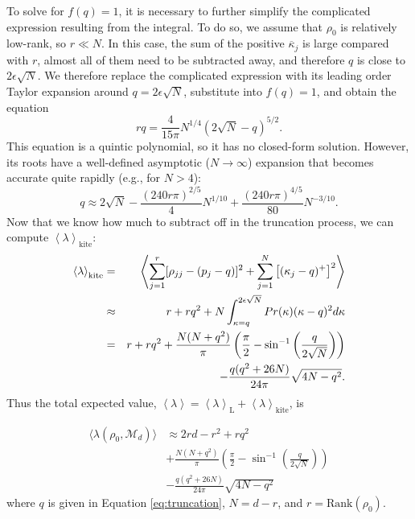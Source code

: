 \documentclass[aps,pra, twocolumn]{revtex4}
\newcommand{\M}{\mathcal{M}}
\newcommand{\expect}[1]{\ensuremath{\left\langle#1\right\rangle}}
\begin{document}
To solve for $f(q) = 1$, it is necessary to further simplify the complicated expression resulting from the integral.  To do so, we 
assume that $\rho_0$ is relatively low-rank, so $r \ll N$.  In this case, the sum of the positive $\overline{\kappa}_j$ is large compared 
with $r$, almost all of them need to be subtracted away, and therefore $q$ is close to $2\epsilon\sqrt{N}$.  We therefore replace 
the complicated expression with its leading order Taylor expansion around $q=2\epsilon\sqrt{N}$, substitute into $f(q)=1$, and 
obtain the equation
\begin{equation}
rq  = \frac{4}{15\pi}N^{1/4}\left(2\sqrt{N}-q\right)^{5/2}.
\end{equation}
This equation is a quintic polynomial, so it has no closed-form solution.  However, its roots have a well-defined asymptotic ($N\to
\infty$) expansion that becomes accurate quite rapidly (e.g., for $N>4$):
\begin{equation}
\label{eq:truncation}
q \approx 2\sqrt{N}-\frac{(240r\pi)^{2/5}}{4}N^{1/10}+\frac{(240r\pi)^{4/5}}{80}N^{-3/10}.
\end{equation}
Now that we know how much to subtract off in the truncation process, we can compute $\expect{\lambda}_{\mathrm{kite}}$:
\begin{eqnarray}
\nonumber \expect{\lambda}_{\mathrm{kite}} &=& \left\langle\sum_{j=1}^{r}[\rho_{jj}- (p_j-q)]^2 + \sum_{j=1}^{N}\left[(\kappa_j-q)^+\right]^2 \right\rangle\\
\nonumber  &\approx& r + rq^2 + N\int_{\kappa=q}^{2\epsilon\sqrt{N}}{ Pr(\kappa)(\kappa-q)^2 d\kappa} \\
\nonumber &=& r + rq^2 + \frac{N(N+q^2)}{\pi} \left( \frac{\pi}{2} - \sin^{-1}\left(\frac{q}{2\sqrt{N}}\right)\right)  \nonumber \\
&&\hspace{0.3in}-\frac{q(q^2+26N)}{24\pi} \sqrt{4N-q^2}.
\end{eqnarray}
Thus the total expected value, $\expect{\lambda} = \expect{\lambda}_{\mathrm{L}} + \expect{\lambda}_{\mathrm{kite}}$, is 

\begin{align}
\label{eq:ourLLRS}
\nonumber \langle \lambda(\rho_{0}, \M_{d}) \rangle &\approx 2rd - r^{2}+rq^{2}\\
\nonumber &+  \frac{N(N+q^2)}{\pi} \left( \frac{\pi}{2} - \sin^{-1}\left(\frac{q}{{2\sqrt{N}}}\right)\right)\\
& - \frac{q(q^2+26N)}{24\pi} \sqrt{4N-q^2}
\end{align}
where $q$ is given in Equation \eqref{eq:truncation}, $N=d-r$, and $r = \mathrm{Rank}(\rho_{0})$.
\end{document}
